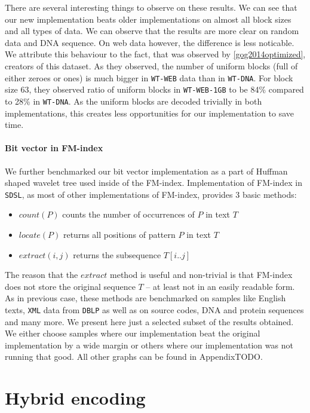 There are several interesting things to observe on these results. We can see that our new implementation
beats older implementations on almost all block sizes and all types of data. We can observe that the
results are more clear on random data and DNA sequence. On web data however, the difference is less
noticable. We attribute this behaviour to the fact, that was observed by \ref{gog2014optimized},
creators of this dataset. As they observed, the number of uniform blocks (full of either zeroes or ones)
is much bigger in \texttt{WT-WEB} data than in \texttt{WT-DNA}. For block size 63, they observed ratio of
uniform blocks in \texttt{WT-WEB-1GB} to be 84\% compared to 28\% in \texttt{WT-DNA}. As the uniform
blocks are decoded trivially in both implementations, this creates less opportunities for our implementation
to save time.

\paragraph{Bit vector in FM-index}

We further benchmarked our bit vector implementation as a part of Huffman shaped wavelet tree
used inside of the FM-index. Implementation of FM-index in \texttt{SDSL}, as most of other
implementations of FM-index, provides 3 basic methods:

\begin{itemize}
	\item $\mathit{count}(P)$ counts the number of occurrences of $P$ in text $T$
	\item $\mathit{locate}(P)$ returns all positions of pattern $P$ in text $T$
	\item $\mathit{extract}(i, j)$ returns the subsequence $T[i..j]$
\end{itemize}

The reason that the $\mathit{extract}$ method is useful and non-trivial is that FM-index
does not store the original sequence $T$ -- at least not in an easily readable form.
As in previous case, these methods are benchmarked on samples like English texts, \texttt{XML}
data from \texttt{DBLP} as well as on source codes, DNA and protein sequences and many more.
We present here just a selected subset of the results obtained. We either choose samples
where our implementation beat the original implementation by a wide margin or others where
our implementation was not running that good. All other graphs can be found in AppendixTODO.

\section{Hybrid encoding}

